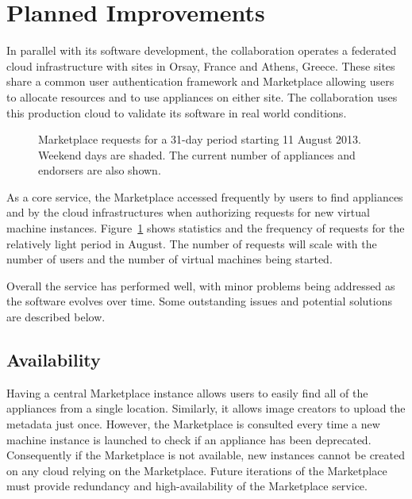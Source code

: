 \section{Planned Improvements}
\label{sec:production}

In parallel with its software development, the collaboration operates
a federated cloud infrastructure with sites in Orsay, France and
Athens, Greece\@.  These sites share a common user authentication
framework and Marketplace allowing users to allocate resources and to
use appliances on either site.  The collaboration uses this production
cloud to validate its software in real world conditions.

\begin{figure}
\caption{Marketplace requests for a 31-day period starting 11 August
  2013.  Weekend days are shaded.  The current number of appliances
  and endorsers are also shown.}
\label{fig:requests}
\end{figure}

As a core service, the Marketplace accessed frequently by users to
find appliances and by the cloud infrastructures when authorizing
requests for new virtual machine instances.  Figure~\ref{fig:requests}
shows statistics and the frequency of requests for the relatively
light period in August\@.  The number of requests will scale with the
number of users and the number of virtual machines being started.

Overall the service has performed well, with minor problems being
addressed as the software evolves over time.  Some outstanding issues
and potential solutions are described below.

\subsection{Availability}

Having a central Marketplace instance allows users to easily find all
of the appliances from a single location.  Similarly, it allows image
creators to upload the metadata just once.  However, the Marketplace
is consulted every time a new machine instance is launched to check if
an appliance has been deprecated.  Consequently if the Marketplace is
not available, new instances cannot be created on any cloud relying on
the Marketplace\@.  Future iterations of the Marketplace must provide
redundancy and high-availability of the Marketplace service. 

